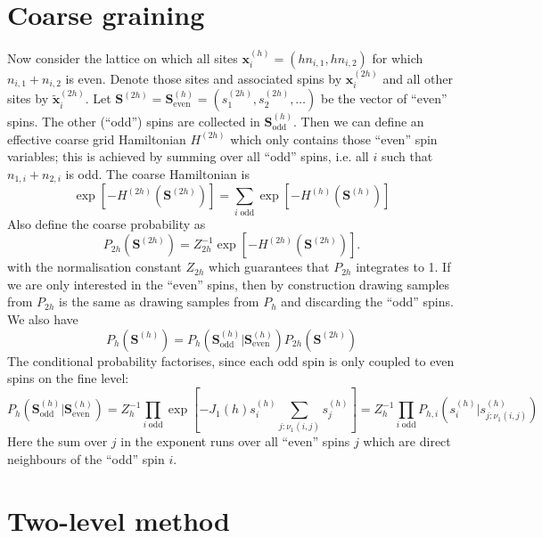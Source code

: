 \documentclass[11pt]{article}
\renewcommand{\vec}[1]{\boldsymbol{#1}}
\begin{document}
\section{Coarse graining}
Now consider the lattice on which all sites $\vec{x}_i^{(h)}=(hn_{i,1},hn_{i,2})$ for which $n_{i,1}+n_{i,2}$ is even. Denote those sites and associated spins by $\vec{x}^{(2h)}_i$ and all other sites by $\tilde{\vec{x}}^{(2h)}_i$. Let $\vec{S}^{(2h)}=\vec{S}^{(h)}_{\text{even}} = (s^{(2h)}_1,s^{(2h)}_2,\dots)$ be the vector of ``even'' spins. The other (``odd'') spins are collected in $\vec{S}^{(h)}_{\text{odd}}$. Then we can define an effective coarse grid Hamiltonian $H^{(2h)}$ which only contains those ``even'' spin variables; this is achieved by summing over all ``odd'' spins, i.e. all $i$ such that $n_{1,i}+n_{2,i}$ is odd. The coarse Hamiltonian is
\begin{equation}
  \exp\left[-H^{(2h)}(\vec{S}^{(2h)})\right] = \sum_{i\;\text{odd}} \exp\left[- H^{(h)}(\vec{S}^{(h)})\right]
\end{equation}
Also define the coarse probability as
\begin{equation}
  P_{2h}(\vec{S}^{(2h)}) = Z_{2h}^{-1}\exp\left[-H^{(2h)}(\vec{S}^{(2h)})\right].
\end{equation}
with the normalisation constant $Z_{2h}$ which guarantees that $P_{2h}$ integrates to 1.
If we are only interested in the ``even'' spins, then by construction drawing samples from $P_{2h}$ is the same as drawing samples from $P_h$ and discarding the ``odd'' spins.
We also have
\begin{equation}
  P_{h}(\vec{S}^{(h)}) = P_{h}(\vec{S}^{(h)}_{\text{odd}}|\vec{S}^{(h)}_{\text{even}}) P_{2h}(\vec{S}^{(2h)})
\end{equation}
The conditional probability factorises, since each odd spin is only coupled to even spins on the fine level:
\begin{equation}
  P_{h}(\vec{S}^{(h)}_{\text{odd}}|\vec{S}^{(h)}_{\text{even}})
  = Z_h^{-1}\prod_{i\;\text{odd}}\exp\left[-J_1(h)s_i^{(h)}\sum_{j:\nu_1(i,j)} s_j^{(h)}\right]=
  Z_h^{-1}\prod_{i\;\text{odd}} P_{h,i}(s_i^{(h)}|s_{j:\nu_1(i,j)}^{(h)})
\end{equation}
Here the sum over $j$ in the exponent runs over all ``even'' spins $j$ which are direct neighbours of the ``odd'' spin $i$.
\section{Two-level method}
\end{document}
